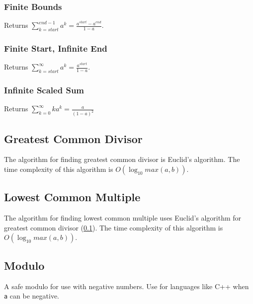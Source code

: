 \documentclass[letterpaper,11pt,twoside]{article}
\begin{document}
                \subsubsection{Finite Bounds}
                    Returns $\sum_{k=start}^{end-1}a^{k} = \frac{a^{start} - a^{end}}{1 - a}$.
                    
                    
                \subsubsection{Finite Start, Infinite End}
                    Returns $\sum_{k=start}^{\infty}a^{k} = \frac{a^{start}}{1 - a}$.
                    
                    
                \subsubsection{Infinite Scaled Sum}
                    Returns $\sum_{k=0}^{\infty}ka^{k} = \frac{a}{(1-a)^{2}}$
                    
                    
            \subsection{Greatest Common Divisor} \label{gcd}
                The algorithm for finding greatest common divisor is Euclid's algorithm.
                The time complexity of this algorithm is $O(\log_{10} max(a,b))$.
                
                
            \subsection{Lowest Common Multiple}
                The algorithm for finding lowest common multiple uses Euclid's algorithm for greatest common divisor (\ref{gcd}).
                The time complexity of this algorithm is $O(\log_{10} max(a,b))$.
                
                
            \subsection{Modulo} \label{modulo}
                A safe modulo for use with negative numbers.
                Use for languages like C++ when \verb|a| can be negative.
                
\end{document}
